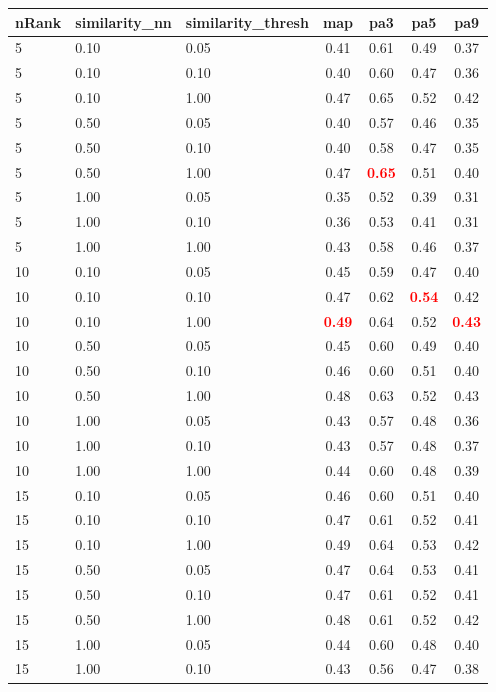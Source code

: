 \begin{tabular}{lllcccc} 
nRank & similarity\_nn & similarity\_thresh & map & pa3 & pa5 & pa9 \\ 
\hline 
 5 & 0.10 & 0.05 & 0.41 & 0.61 & 0.49 & 0.37 \\ 
 5 & 0.10 & 0.10 & 0.40 & 0.60 & 0.47 & 0.36 \\ 
 5 & 0.10 & 1.00 & 0.47 & 0.65 & 0.52 & 0.42 \\ 
 5 & 0.50 & 0.05 & 0.40 & 0.57 & 0.46 & 0.35 \\ 
 5 & 0.50 & 0.10 & 0.40 & 0.58 & 0.47 & 0.35 \\ 
 5 & 0.50 & 1.00 & 0.47 & \textbf{\textcolor{red}{0.65}} & 0.51 & 0.40 \\ 
 5 & 1.00 & 0.05 & 0.35 & 0.52 & 0.39 & 0.31 \\ 
 5 & 1.00 & 0.10 & 0.36 & 0.53 & 0.41 & 0.31 \\ 
 5 & 1.00 & 1.00 & 0.43 & 0.58 & 0.46 & 0.37 \\ 
10 & 0.10 & 0.05 & 0.45 & 0.59 & 0.47 & 0.40 \\ 
10 & 0.10 & 0.10 & 0.47 & 0.62 & \textbf{\textcolor{red}{0.54}} & 0.42 \\ 
10 & 0.10 & 1.00 & \textbf{\textcolor{red}{0.49}} & 0.64 & 0.52 & \textbf{\textcolor{red}{0.43}} \\ 
10 & 0.50 & 0.05 & 0.45 & 0.60 & 0.49 & 0.40 \\ 
10 & 0.50 & 0.10 & 0.46 & 0.60 & 0.51 & 0.40 \\ 
10 & 0.50 & 1.00 & 0.48 & 0.63 & 0.52 & 0.43 \\ 
10 & 1.00 & 0.05 & 0.43 & 0.57 & 0.48 & 0.36 \\ 
10 & 1.00 & 0.10 & 0.43 & 0.57 & 0.48 & 0.37 \\ 
10 & 1.00 & 1.00 & 0.44 & 0.60 & 0.48 & 0.39 \\ 
15 & 0.10 & 0.05 & 0.46 & 0.60 & 0.51 & 0.40 \\ 
15 & 0.10 & 0.10 & 0.47 & 0.61 & 0.52 & 0.41 \\ 
15 & 0.10 & 1.00 & 0.49 & 0.64 & 0.53 & 0.42 \\ 
15 & 0.50 & 0.05 & 0.47 & 0.64 & 0.53 & 0.41 \\ 
15 & 0.50 & 0.10 & 0.47 & 0.61 & 0.52 & 0.41 \\ 
15 & 0.50 & 1.00 & 0.48 & 0.61 & 0.52 & 0.42 \\ 
15 & 1.00 & 0.05 & 0.44 & 0.60 & 0.48 & 0.40 \\ 
15 & 1.00 & 0.10 & 0.43 & 0.56 & 0.47 & 0.38 \\ 

\end{tabular}
